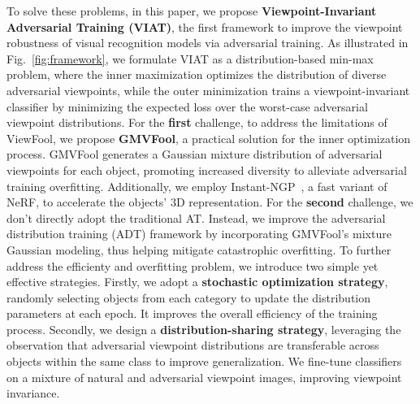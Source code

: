 \documentclass[10pt,journal,compsoc]{IEEEtran}
\begin{document}
To solve these problems, in this paper, we propose \textbf{ Viewpoint-Invariant Adversarial Training (VIAT)}, the first framework to improve the viewpoint robustness of visual recognition models via adversarial training. As illustrated in Fig.~\ref{fig:framework}, we formulate VIAT as a distribution-based min-max problem, where the inner maximization optimizes the distribution of diverse adversarial viewpoints, while the outer minimization trains a viewpoint-invariant classifier by minimizing the expected loss over the worst-case adversarial viewpoint distributions. For the \textbf{first} challenge, to address the limitations of ViewFool, we propose \textbf{GMVFool}, a practical solution for the inner optimization process. GMVFool generates a Gaussian mixture distribution of adversarial viewpoints for each object, promoting increased diversity to alleviate adversarial training overfitting. Additionally, we employ Instant-NGP~\cite{mueller2022instant}, a fast variant of NeRF, to accelerate the objects' 3D representation. For the \textbf{second} challenge,  we don't directly adopt the traditional AT. Instead, we improve the adversarial distribution training (ADT) \cite{dong2020adversarial} framework by incorporating GMVFool's mixture Gaussian modeling, thus helping mitigate catastrophic overfitting. To further address the efficienty and overfitting problem, we introduce two simple yet effective strategies. Firstly, we adopt a \textbf{stochastic optimization strategy}, randomly selecting objects from each category to update the distribution parameters at each epoch. It improves the overall efficiency of the training process. Secondly, we design a \textbf{distribution-sharing strategy}, leveraging the observation that adversarial viewpoint distributions are transferable across objects within the same class to improve generalization. We fine-tune classifiers on a mixture of natural and adversarial viewpoint images, improving viewpoint invariance.

\end{document}
